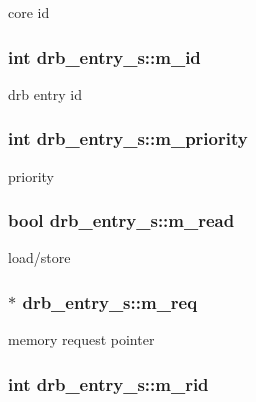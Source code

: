 \label{structdrb__entry__s_ab497c914977561ea3f790b90a80fcbea}
core id \hypertarget{structdrb__entry__s_af2230e8e5cbc01c5d1d36e7bd9ff2baf}{
\subsubsection[{m\_\-id}]{\setlength{\rightskip}{0pt plus 5cm}int {\bf drb\_\-entry\_\-s::m\_\-id}}}
\label{structdrb__entry__s_af2230e8e5cbc01c5d1d36e7bd9ff2baf}
drb entry id \hypertarget{structdrb__entry__s_a09a64c18e0299a6390ca456c08de7e31}{
\subsubsection[{m\_\-priority}]{\setlength{\rightskip}{0pt plus 5cm}int {\bf drb\_\-entry\_\-s::m\_\-priority}}}
\label{structdrb__entry__s_a09a64c18e0299a6390ca456c08de7e31}
priority \hypertarget{structdrb__entry__s_a209735d05c8d951ac9f4b7df8ef19ea6}{
\subsubsection[{m\_\-read}]{\setlength{\rightskip}{0pt plus 5cm}bool {\bf drb\_\-entry\_\-s::m\_\-read}}}
\label{structdrb__entry__s_a209735d05c8d951ac9f4b7df8ef19ea6}
load/store \hypertarget{structdrb__entry__s_ae49002fe9eceba05d97cf23ddcceeaea}{
\subsubsection[{m\_\-req}]{$\ast$ {\bf drb\_\-entry\_\-s::m\_\-req}}}
\label{structdrb__entry__s_ae49002fe9eceba05d97cf23ddcceeaea}
memory request pointer \hypertarget{structdrb__entry__s_ae2b908fe6d45df4e87ff9311cb3a7cb3}{
\subsubsection[{m\_\-rid}]{\setlength{\rightskip}{0pt plus 5cm}int {\bf drb\_\-entry\_\-s::m\_\-rid}}}
